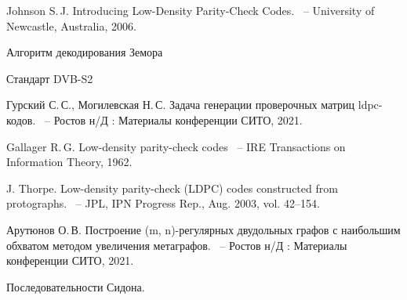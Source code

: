 \documentclass[14pt]{mmcs-article}
\begin{document}
\begin{thebibliography}{0}

Johnson S.\,J.
Introducing Low-Density Parity-Check Codes.
~-- University of Newcastle, Australia, 2006.

Алгоритм декодирования Земора

Стандарт DVB-S2

Гурский С.\,С., Могилевская Н.\,С.
Задача генерации проверочных матриц ldpc-кодов.
~-- Ростов н/Д : Материалы конференции СИТО, 2021.

Gallager R.\,G. 
Low-density parity-check codes
~-- IRE Transactions on Information Theory, 1962.

J. Thorpe. 
Low-density parity-check (LDPC) codes constructed from protographs.
~-- JPL, IPN Progress Rep., Aug. 2003, vol. 42–154.


Арутюнов О.\,В.
Построение (m, n)-регулярных двудольных графов с наибольшим обхватом методом увеличения метаграфов.
~-- Ростов н/Д : Материалы конференции СИТО, 2021.

Последовательности Сидона.


\end{thebibliography}
\end{document}
